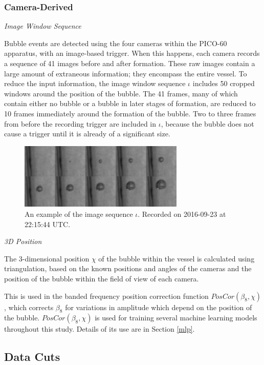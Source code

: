 \documentclass[10pt]{article}
\begin{document}
\subsubsection{Camera-Derived} \label{camera_derived}

\textit{Image Window Sequence}

Bubble events are detected using the four cameras within the PICO-60 apparatus, with an image-based trigger. When this happens, each camera records a sequence of 41 images before and after formation. These raw images contain a large amount of extraneous information; they encompass the entire vessel. To reduce the input information, the image window sequence $\iota$ includes 50 cropped windows around the position of the bubble. The 41 frames, many of which contain either no bubble or a bubble in later stages of formation, are reduced to 10 frames immediately around the formation of the bubble. Two to three frames from before the recording trigger are included in $\iota$, because the bubble does not cause a trigger until it is already of a significant size.

\begin{figure}[h]
    \centering
    \includegraphics[width=0.7\textwidth]{image_grid}
    \caption{\label{} An example of the image sequence $\iota$. Recorded on 2016-09-23 at 22:15:44 UTC.}
\end{figure}

\textit{3D Position}

The 3-dimensional position $\chi$ of the bubble within the vessel is calculated using triangulation, based on the known positions and angles of the cameras and the position of the bubble within the field of view of each camera.

This is used in the banded frequency position correction function $PosCor(\beta _{8}, \chi)$, which corrects $\beta _{8}$ for variations in amplitude which depend on the position of the bubble. $PosCor(\beta _{8}, \chi)$ is used for training several machine learning models throughout this study. Details of its use are in Section \ref{mlp}.

\subsection{Data Cuts}
\end{document}
